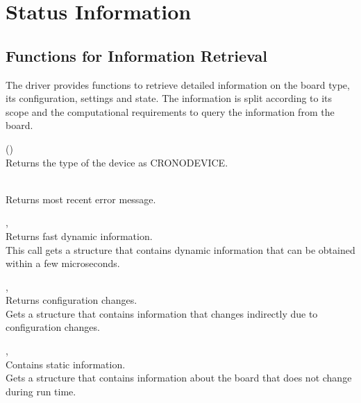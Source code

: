 \section{Status Information}
	

\subsection{Functions for Information Retrieval}
    The driver provides functions to retrieve detailed information on the board type, its configuration, settings and state. 
    The information is split according to its scope and the computational requirements to query the information from the board.
    

    (\device)\\
    Returns the type of the device as \textsf{CRONO\tu DEVICE\tu {}}.\par

    \\
    Returns most recent error message.\par

    \deviceindex, \lb{}\\
    Returns fast dynamic information.\\
    This call gets a structure that contains dynamic information that can be obtained within a few microseconds.\par

    \deviceindex, \lb{}\\
    Returns configuration changes.\\
    Gets a structure that contains information that changes indirectly due to configuration changes.\par


    \deviceindex, \lb{}\\
    Contains static information.\\
    Gets a structure that contains information about the board that does not change during run time.\par 

